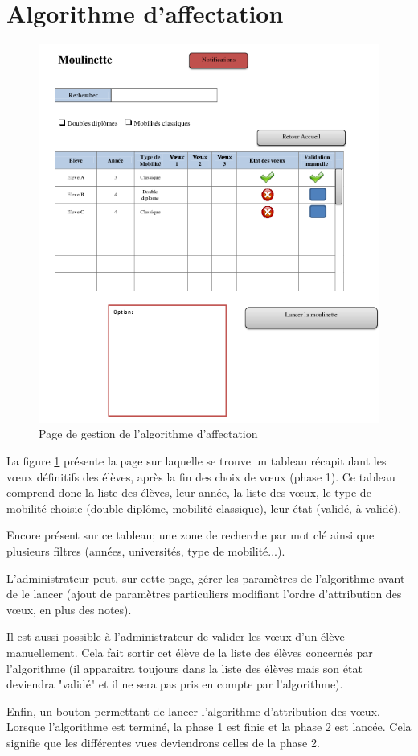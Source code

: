 \section{Algorithme d'affectation}
\label{sec::moulinette}

\begin{figure}[H]
	\includegraphics[scale=0.7]{Admin/Moul.png}
	\caption{Page de gestion de l'algorithme d'affectation}
	\label{fig::moulinette}
\end{figure}

La figure \ref{fig::moulinette} présente la page sur laquelle se trouve un tableau récapitulant les vœux définitifs des élèves, après la fin des choix de vœux (phase 1). Ce tableau comprend donc la liste des élèves, leur année, la liste des vœux, le type de mobilité choisie (double diplôme, mobilité classique), leur état (validé, à validé).

Encore présent sur ce tableau; une zone de recherche par mot clé ainsi que plusieurs filtres (années, universités, type de mobilité...).

\bigbreak

L'administrateur peut, sur cette page, gérer les paramètres de l'algorithme avant de le lancer (ajout de paramètres particuliers modifiant l'ordre d'attribution des vœux, en plus des notes).

\bigbreak

Il est aussi possible à l'administrateur de valider les vœux d'un élève manuellement. Cela fait sortir cet élève de la liste des élèves concernés par l'algorithme (il apparaitra toujours dans la liste des élèves mais son état deviendra "validé" et il ne sera pas pris en compte par l'algorithme).

\bigbreak

Enfin, un bouton permettant de lancer l'algorithme d'attribution des vœux. Lorsque l'algorithme est terminé, la phase 1 est finie et la phase 2 est lancée. Cela signifie que les différentes vues deviendrons celles de la phase 2.